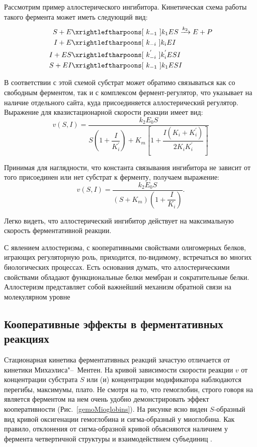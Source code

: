 \documentclass[12pt,a4paper,oneside]{book}
\begin{document}
Рассмотрим пример аллостерического ингибитора. Кинетическая схема работы такого фермента может иметь следующий вид:
\begin{align}
 S + E & \xrightleftharpoons [~k_{-1}~] {k_1}  ES \xrightarrow {k_2} E + P \\ 
 I + E & \xrightleftharpoons [~k_{-i}~] {k_i} EI  \nonumber \\
 I + ES & \xrightleftharpoons [~k_{-i}^{'}~] {k_i^{'}} ESI \nonumber \\
 S + EI & \xrightleftharpoons [~k_{-1}~] {k_1}  ESI \nonumber
\end{align}

В соответствии с этой схемой субстрат может обратимо связываться как со свободным ферментом, так и с комплексом фермент-регулятор, что указывает на наличие отдельного сайта, куда присоединяется аллостерический регулятор. Выражение для квазистационарной скорости реакции имеет вид: 
\begin{equation}
v(S, I) = \dfrac{k_2 E_0 S}{ S \left( 1 + \dfrac{I}{K_i^{'}} \right) + K_m \left[ 1 + \dfrac{I (K_i + K_i^{'})}{2 K_i K_i^{'}} \right]} 
\end{equation}


Принимая для наглядности, что константа связывания ингибитора не зависит от того присоединен или нет субстрат к ферменту, получаем выражение:
\begin{equation}
v(S, I) = \dfrac{k_2 E_0 S}{ \left( S + K_m \right) \left( 1 + \dfrac{I}{K_i}\right) }.
\end{equation}

Легко видеть, что аллостерический ингибитор действует на максимальную скорость ферментативной реакции. 

С явлением аллостеризма, с кооперативными свойствами олигомерных белков, играющих регуляторную роль, приходится, по-видимому, встречаться во многих биологических процессах. Есть основания думать, что аллостерическими свойствами обладают функциональные белки мембран и сократительные белки. Аллостеризм представляет собой важнейший механизм обратной связи на молекулярном уровне


\subsection{Кооперативные эффекты в ферментативных реакциях}

Стационарная кинетика ферментативных реакций зачастую отличается от кинетики Михаэлиса"--~Ментен. На кривой зависимости скорости реакции $ v $  от концентрации субстрата $ S $ или (и) концентрации модификатора наблюдаются перегибы, максимумы, плато. Не смотря на то, что гемоглобин, строго говоря на является ферментом на нем очень удобно демонстрировать эффект кооперативности (Рис.~\ref{gemoMioglobins}). На рисунке ясно виден $ S $-образный вид кривой оксигенации гемоглобина и сигма-образный у миоглобина. Как правило, отклонения от сигма-образной кривой объясняются наличием у фермента четвертичной структуры и взаимодействием субъединиц \cite[стр. 373]{Finkelshtejn2012}.
\end{document}
